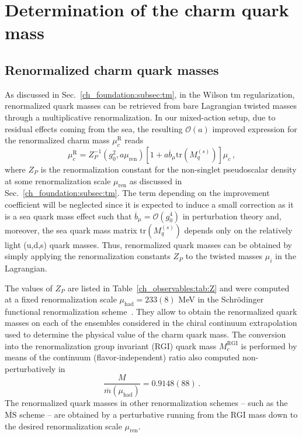 \section{Determination of the charm quark mass}
\label{sec:mc}

\subsection{Renormalized charm quark masses}

%
As discussed in Sec.~\ref{ch_foundation:subsec:tm}, in the Wilson tm regularization, renormalized quark masses can be retrieved from bare Lagrangian twisted masses through a multiplicative renormalization. In our mixed-action setup, due to residual effects coming from the sea, the resulting $\mathcal{O}(a)$ improved expression for the renormalized  charm mass $\mu^{\textrm{R}}_c$ reads
\begin{equation}
	\mu^{\textrm{R}}_c=Z_P^{-1}(g_0^2,a\mu_{\textrm{ren}})\left[1+a\overline{b}_\mu\textrm{tr}\left(M_q^{(s)}\right)\right]\mu_c\,,
	\label{eq:renormalized_charm_mass}
\end{equation}
where $Z_P$ is the renormalization constant for the non-singlet
pseudoscalar density at some renormalization scale $\mu_{\textrm{ren}}$ as discussed in Sec.~\ref{ch_foundation:subsec:tm}.
%
The term depending on the improvement coefficient  will be neglected since it is expected to induce a small correction as it is a sea quark mass effect such that $\overline{b}_{\mu} = \mathcal{O}(g_0^4)$ in perturbation theory and, moreover, the sea quark mass matrix $\textrm{tr}\left(M_q^{(s)}\right)$ depends only on the  relatively light (u,d,s) quark masses. Thus, renormalized quark masses can be obtained by simply applying the renormalization constants $Z_P$ to the twisted masses $\mu_i$ in the Lagrangian.
%

The values of $Z_P$ are listed in Table~\ref{ch_observables:tab:Z} and were computed at a fixed renormalization scale $\mu_{\textrm{had}}=233(8)$ MeV in the Schrödinger functional renormalization scheme~\citep{Campos:2018ahf}. They allow to obtain the renormalized quark masses on each of the ensembles considered in the chiral continuum extrapolation used to determine the physical value of the charm quark mass.
%
The conversion into the renormalization group invariant (RGI) quark mass $M_c^{\mathrm{RGI}}$ is performed by means of the continuum (flavor-independent) ratio also computed non-perturbatively in~\cite{Campos:2018ahf}
\begin{equation}
	\frac{M}{\overline{m}(\mu_{\mathrm{had}})} = 0.9148(88)\,.
	\label{eq:rgi_running_factor}
\end{equation}
%
The renormalized quark masses in other renormalization schemes -- such as the $\overline{\textrm{MS}}$ scheme -- are obtained by a perturbative running from the RGI mass down to the desired renormalization scale $\mu_{\textrm{ren}}$.
%

